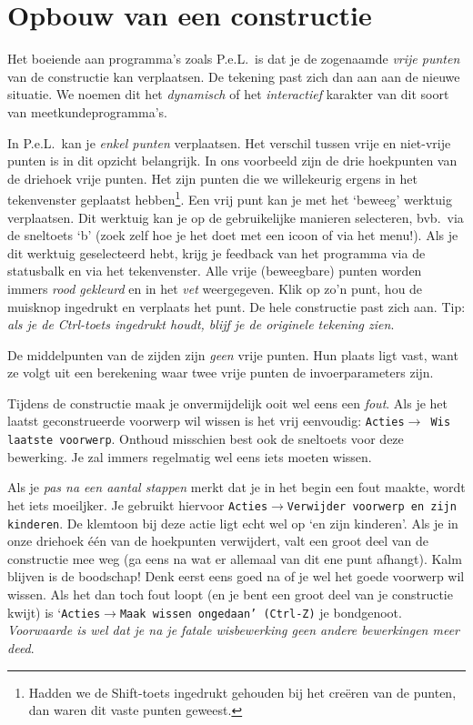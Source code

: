\section{Opbouw van een constructie}
Het boeiende aan programma's zoals P.e.L.\ is dat je de zogenaamde \emph{vrije punten} van de constructie kan verplaatsen. De tekening past zich dan aan aan de nieuwe situatie. We noemen dit het \emph{dynamisch} of het \emph{interactief} karakter van dit soort van meetkundeprogramma's. 

In P.e.L.\ kan je \emph{enkel punten} verplaatsen. Het verschil tussen vrije en niet-vrije punten is in dit opzicht belangrijk. In ons voorbeeld zijn de drie hoekpunten van de driehoek vrije punten. Het zijn punten die we willekeurig ergens in het tekenvenster geplaatst hebben\footnote{Hadden we de Shift-toets ingedrukt gehouden bij het cre\"{e}ren van de punten, dan waren dit vaste punten geweest.}. Een vrij punt kan je met het `beweeg' werktuig verplaatsen. Dit werktuig kan je op de gebruikelijke manieren selecteren, bvb.\ via de sneltoets `b' (zoek zelf hoe je het doet met een icoon of via het menu!). Als je dit werktuig geselecteerd hebt, krijg je feedback van het programma via de statusbalk en via het tekenvenster. Alle vrije (beweegbare) punten worden immers \emph{rood gekleurd} en in het \emph{vet} weergegeven. Klik op zo'n punt, hou de muisknop ingedrukt en verplaats het punt. De hele constructie past zich aan. Tip: \emph{als je de Ctrl-toets ingedrukt houdt, blijf je de originele tekening zien}.

De middelpunten van de zijden zijn \emph{geen} vrije punten. Hun plaats ligt vast, want ze volgt uit een berekening waar twee vrije punten de invoerparameters zijn. 

Tijdens de constructie maak je onvermijdelijk ooit wel eens een \emph{fout}. Als je het laatst geconstrueerde voorwerp wil wissen is het vrij eenvoudig: \texttt{Acties$\rightarrow$ Wis laatste voorwerp}. Onthoud misschien best ook de sneltoets voor deze bewerking. Je zal immers regelmatig wel eens iets moeten wissen.

Als je \emph{pas na een aantal stappen} merkt dat je in het begin een fout maakte, wordt het iets moeiljker. Je gebruikt hiervoor \texttt{Acties$\rightarrow$Verwijder voorwerp en zijn kinderen}. De klemtoon bij deze actie ligt echt wel op `en zijn kinderen'. Als je in onze driehoek \'{e}\'{e}n van de hoekpunten verwijdert, valt een groot deel van de constructie mee weg (ga eens na wat er allemaal van dit ene punt afhangt). Kalm blijven is de boodschap! Denk eerst eens goed na of je wel het goede voorwerp wil wissen. Als het dan toch fout loopt (en je bent een groot deel van je constructie kwijt) is `\texttt{Acties$\rightarrow$Maak wissen ongedaan' (Ctrl-Z)} je bondgenoot. \emph{Voorwaarde is wel dat je na je fatale wisbewerking geen andere bewerkingen meer deed}. 

